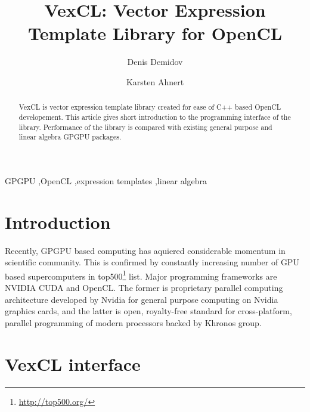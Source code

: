 \documentclass[1p]{elsarticle}
\begin{document}
\begin{frontmatter}

\title{VexCL: Vector Expression Template Library for OpenCL}

\author{Denis Demidov}
\address{
Kazan Branch of Joint Supercomputer Center,
Russian Academy of Sciences,\\
Lobachevsky st. 2/31, 420008 Kazan, Russia
}


\author{Karsten Ahnert}
\address{
Institut f\"ur Physik und Astronomie, Universit\"at Potsdam,\\
Karl-Liebknecht-Strasse 24/25, 14476 Potsdam-Golm, Germany
}

\begin{abstract}
    VexCL is vector expression template library created for ease of C++ based
    OpenCL developement. This article gives short introduction to the
    programming interface of the library. Performance of the library is
    compared with existing general purpose and linear algebra GPGPU packages.
\end{abstract}

\begin{keyword}
    GPGPU \sep OpenCL \sep expression templates \sep linear algebra
\end{keyword}

\end{frontmatter}

\section{Introduction}

Recently, GPGPU based computing has aquiered considerable momentum in
scientific community. This is confirmed by constantly increasing number of GPU
based supercomputers in
top500\footnote{\href{http://top500.org/}{http://top500.org/}} list. Major
programming frameworks are NVIDIA CUDA and OpenCL.  The former is proprietary
parallel computing architecture developed by Nvidia for general purpose
computing on Nvidia graphics cards, and the latter is open, royalty-free
standard for cross-platform, parallel programming of modern processors backed
by Khronos group.

\section{VexCL interface}
\end{document}
